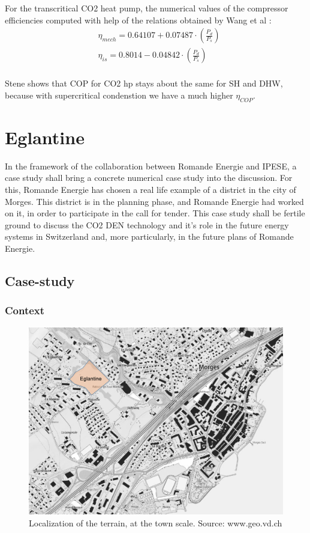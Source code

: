 \documentclass{article}
\begin{document}
For the transcritical CO2 heat pump, the numerical values of the compressor efficiencies computed with help of the relations obtained by Wang et al \cite{wangExperimentalInvestigationAirsource2013}:
\begin{align}
	& \eta_{mech} = 0.64107+0.07487\cdot(\frac{P_{d}}{P_{s}})\\
	& \eta_{is} = 0.8014-0.04842\cdot(\frac{P_{d}}{P_{s}})\\
\end{align}

Stene shows that COP for CO2 hp stays about the same for SH and DHW, because with supercritical condenstion we have a much higher $\eta_{COP}$.\cite{steneINTEGRATEDCO2HEAT2007}


\section{Eglantine}
In the framework of the collaboration between Romande Energie and IPESE, a case study shall bring a concrete numerical case study into the discussion. For this, Romande Energie has chosen a real life example of a district in the city of Morges. This district is in the planning phase, and Romande Energie had worked on it, in order to participate in the call for tender. This case study shall be fertile ground to discuss the CO2 DEN technology and it's role in the future energy systems in Switzerland and, more particularly, in the future plans of Romande Energie.

\subsection{Case-study}
\subsubsection{Context}

\begin{figure}[h!]
\centering
\includegraphics[width=1\textwidth]{morges.png}
\caption{Localization of the terrain, at the town scale. Source: www.geo.vd.ch}
\label{fig:morges}
\end{figure}
\end{document}

